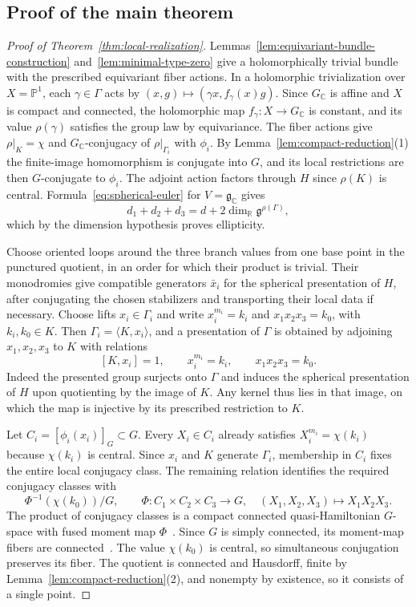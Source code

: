 \documentclass[11pt,a4paper,reqno]{amsart}
\theoremstyle{plain}
\theoremstyle{definition}
\theoremstyle{remark}
\numberwithin{equation}{section}
\newcommand{\CC}{\mathbb C}
\newcommand{\RR}{\mathbb R}
\newcommand{\PP}{\mathbb P}
\newcommand{\fg}{\mathfrak g}
\begin{document}
\subsection{Proof of the main theorem}

\begin{proof}[Proof of Theorem~\ref{thm:local-realization}]
Lemmas~\ref{lem:equivariant-bundle-construction} and~\ref{lem:minimal-type-zero} give a holomorphically trivial bundle with the prescribed equivariant fiber actions. In a holomorphic trivialization over $X=\PP^1$, each $\gamma\in\Gamma$ acts by $(x,g)\mapsto(\gamma x,f_\gamma(x)g)$. Since $G_{\CC}$ is affine and $X$ is compact and connected, the holomorphic map $f_\gamma\colon X\to G_{\CC}$ is constant, and its value $\rho(\gamma)$ satisfies the group law by equivariance. The fiber actions give $\rho|_K=\chi$ and $G_{\CC}$-conjugacy of $\rho|_{\Gamma_i}$ with $\phi_i$. By Lemma~\ref{lem:compact-reduction}(1) the finite-image homomorphism is conjugate into $G$, and its local restrictions are then $G$-conjugate to $\phi_i$. The adjoint action factors through $H$ since $\rho(K)$ is central. Formula~\eqref{eq:spherical-euler} for $V=\fg_{\CC}$ gives
\[
d_1+d_2+d_3=d+2\dim_{\RR}\fg^{\rho(\Gamma)},
\]
which by the dimension hypothesis proves ellipticity.

Choose oriented loops around the three branch values from one base point in the punctured quotient, in an order for which their product is trivial. Their monodromies give compatible generators $\bar x_i$ for the spherical presentation of $H$, after conjugating the chosen stabilizers and transporting their local data if necessary. Choose lifts $x_i\in\Gamma_i$ and write $x_i^{m_i}=k_i$ and $x_1x_2x_3=k_0$, with $k_i,k_0\in K$. Then $\Gamma_i=\langle K,x_i\rangle$, and a presentation of $\Gamma$ is obtained by adjoining $x_1,x_2,x_3$ to $K$ with relations
\[
[K,x_i]=1,\qquad x_i^{m_i}=k_i,\qquad x_1x_2x_3=k_0.
\]
Indeed the presented group surjects onto $\Gamma$ and induces the spherical presentation of $H$ upon quotienting by the image of $K$. Any kernel thus lies in that image, on which the map is injective by its prescribed restriction to $K$.

Let $C_i=[\phi_i(x_i)]_G\subset G$. Every $X_i\in C_i$ already satisfies $X_i^{m_i}=\chi(k_i)$ because $\chi(k_i)$ is central. Since $x_i$ and $K$ generate $\Gamma_i$, membership in $C_i$ fixes the entire local conjugacy class. The remaining relation identifies the required conjugacy classes with
\[
\Phi^{-1}(\chi(k_0))/G,\qquad
\Phi\colon C_1\times C_2\times C_3\longrightarrow G,\quad
(X_1,X_2,X_3)\longmapsto X_1X_2X_3.
\]
The product of conjugacy classes is a compact connected quasi-Hamiltonian $G$-space with fused moment map $\Phi$~\cite[Proposition~3.1 and Theorem~6.1]{AMM}. Since $G$ is simply connected, its moment-map fibers are connected~\cite[Theorem~7.2]{AMM}. The value $\chi(k_0)$ is central, so simultaneous conjugation preserves its fiber. The quotient is connected and Hausdorff, finite by Lemma~\ref{lem:compact-reduction}(2), and nonempty by existence, so it consists of a single point.
\end{proof}
\end{document}
